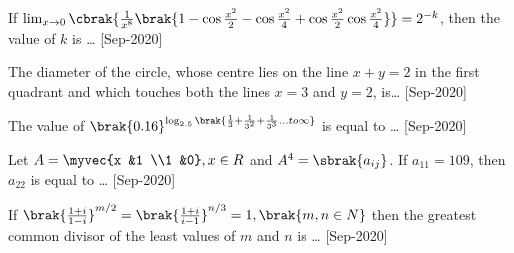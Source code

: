 \iffalse
\title{2020}
\author{EE24BTECH11021}
\section{integer}
\fi
 \item If $\lim_{x \to 0} \cbrak{\frac{1}{x^8}\brak{1-\cos{\frac{x^2}{2}}-\cos{\frac{x^2}{4}}+\cos{\frac{x^2}{2}}\cos{\frac{x^2}{4}}}}=2^{-k}$, then the value of $k$ is \dots 
    \hfill{[Sep-2020]}
    \item The diameter of the circle, whose centre lies on the line $x + y = 2$ in the first quadrant and which touches both the lines $x=3$ and $y=2$, is\dots
    \hfill{[Sep-2020]}
    \item The value of $\brak{0.16}^{\log_{2.5}\brak{\frac{1}{3}+\frac{1}{3^2}+\frac{1}{3^3}\dots to \infty}}$ is equal to \dots 
    \hfill{[Sep-2020]}
    \item Let $A=\myvec{x &1 \\1 &0},x\in R$ and $A^4=\sbrak{a_{ij}}$. If $a_{11}=109$, then $a_{22}$ is equal to \dots
    \hfill{[Sep-2020]}
    \item If $\brak{\frac{1+i}{1-i}}^{m/2}=\brak{\frac{1+i}{i-1}}^{n/3}=1,\brak{m,n\in N}$ then the greatest common divisor of the least values of $m$ and $n$ is \dots
    \hfill{[Sep-2020]}
